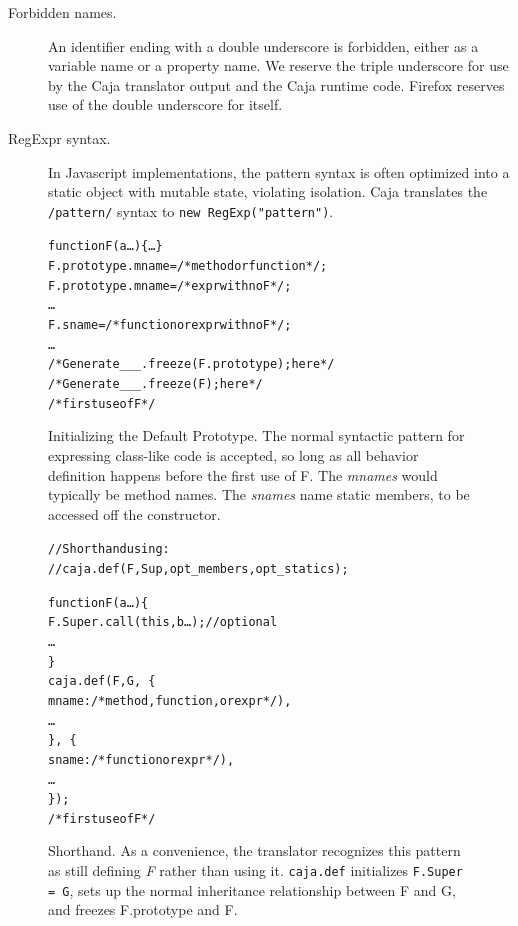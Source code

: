 \documentclass[letterpaper,twocolumn,10pt]{article}
\newcommand{\code}[1]{{\tt {#1}}}              %
\begin{document}
\begin{description}
    \item[Forbidden names.] An identifier ending with a double underscore is 
    forbidden, either as a variable name or a property name. We reserve the 
    triple underscore for use by the Caja translator output and the Caja 
    runtime code. Firefox reserves use of the double underscore for itself.
    
    \item[RegExpr syntax.] In Javascript implementations, the pattern syntax 
    is often optimized into a static object with mutable state, violating 
    isolation. Caja translates the \code{/pattern/} syntax to \code{new 
    RegExp("pattern")}.
        
\end{description}

\begin{figure}
\begin{alltt}
function F(a\ldots)\{\ldots\}
F.prototype.mname = /*method or function*/;
F.prototype.mname = /*expr with no F*/;
\ldots
F.sname = /*function or expr with no F*/;
\ldots
/*Generate \_\_\_.freeze(F.prototype); here*/
/*Generate \_\_\_.freeze(F); here*/
/*first use of F*/
\end{alltt}

\caption[Initializing the Default Prototype]{Initializing the Default
Prototype. The normal syntactic pattern for expressing class-like code is
accepted, so long as all behavior definition happens before the first use of
F. The \emph{mnames} would typically be method names. The \emph{snames} name
static members, to be accessed off the constructor.}
\label{fig:use-proto}
\end{figure}


\begin{figure}
\begin{alltt}
// Shorthand using:
// caja.def(F,Sup,opt_members,opt_statics);

function F(a\ldots)\{
  F.Super.call(this,b\ldots); //optional
  \ldots
\}
caja.def(F, G,\ \{
  mname: /*method, function, or expr*/),
  \ldots
\},\ \{
  sname: /*function or expr*/),
  \ldots
\});
/*first use of F*/
\end{alltt}

\caption[Shorthand.]{Shorthand. As a convenience, the translator recognizes 
this pattern as still defining \emph{F} rather than using it. \code{caja.def}
initializes \code{F.Super = G}, sets up the normal inheritance relationship
between F and G, and freezes F.prototype and F.}
\label{fig:shorthand}
\end{figure}
\end{document}
